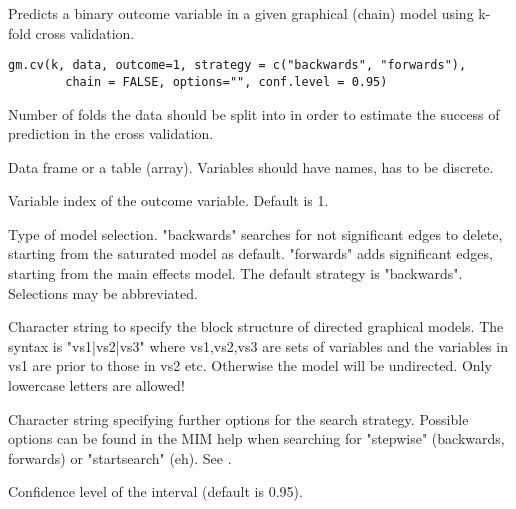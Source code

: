 \begin{Description}\relax
Predicts a binary outcome variable in a given graphical (chain) model
using k-fold cross validation.
\end{Description}
\begin{Usage}
\begin{verbatim}
gm.cv(k, data, outcome=1, strategy = c("backwards", "forwards"),
        chain = FALSE, options="", conf.level = 0.95)
\end{verbatim}
\end{Usage}
\begin{Arguments}
\begin{ldescription}
\item[\code{k}] Number of folds the data should be split into in order to estimate the success of prediction in the cross validation. 
\item[\code{data}] Data frame or a table (array). Variables should have names,  has to be discrete. 
\item[\code{outcome}] Variable index of the outcome variable. Default is 1.
\item[\code{strategy}] Type of model selection. "backwards" searches for not significant edges to delete, starting from the saturated model as default.
"forwards" adds significant edges, starting from the main effects model. 
The default strategy is "backwards". Selections may be abbreviated.

\item[\code{chain}] Character string to specify the block structure of directed graphical models.
The syntax is "vs1|vs2|vs3" where vs1,vs2,vs3 are sets of variables and the variables in vs1 are prior to those in vs2 etc. Otherwise the model will be undirected. 
Only lowercase letters are allowed!
\item[\code{options}] Character string specifying further options for the search strategy. Possible options can be found in the MIM help when searching for
"stepwise" (backwards, forwards) or "startsearch" (eh).  See .

\item[\code{conf.level}] Confidence level of the interval (default is 0.95). 
\end{ldescription}
\end{Arguments}
